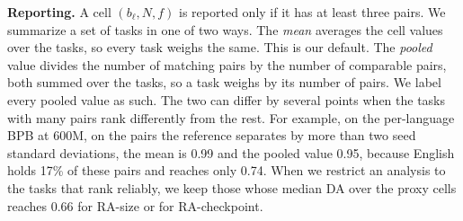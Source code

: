 \textbf{Reporting.} A cell $(b_\ell, N, f)$ is reported only if it has at least three pairs. We summarize a set of tasks in one of two ways. The \emph{mean} averages the cell values over the tasks, so every task weighs the same. This is our default. The \emph{pooled} value divides the number of matching pairs by the number of comparable pairs, both summed over the tasks, so a task weighs by its number of pairs. We label every pooled value as such. The two can differ by several points when the tasks with many pairs rank differently from the rest. For example, on the per-language BPB at 600M, on the pairs the reference separates by more than two seed standard deviations, the mean is 0.99 and the pooled value 0.95, because English holds 17\% of these pairs and reaches only 0.74. When we restrict an analysis to the tasks that rank reliably, we keep those whose median DA over the proxy cells reaches 0.66 for RA-size or for RA-checkpoint.
